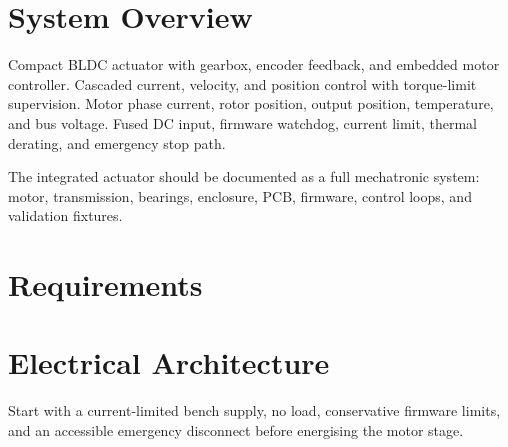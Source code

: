\documentclass[confidential]{nervtech-engdoc}
\begin{document}
\maketitle
\tableofcontents
\newpage

\begin{revisionhistory}
\end{revisionhistory}

\section{System Overview}
\systemsummary
  {Compact BLDC actuator with gearbox, encoder feedback, and embedded motor controller.}
  {Cascaded current, velocity, and position control with torque-limit supervision.}
  {Motor phase current, rotor position, output position, temperature, and bus voltage.}
  {Fused DC input, firmware watchdog, current limit, thermal derating, and emergency stop path.}

\begin{designnote}
The integrated actuator should be documented as a full mechatronic system: motor, transmission, bearings, enclosure, PCB, firmware, control loops, and validation fixtures.
\end{designnote}

\section{Requirements}
\begin{requirementstable}
\end{requirementstable}

\section{Electrical Architecture}
\begin{safetynote}
Start with a current-limited bench supply, no load, conservative firmware limits, and an accessible emergency disconnect before energising the motor stage.
\end{safetynote}
\end{document}

